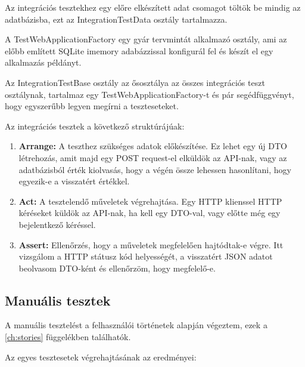 Az integrációs tesztekhez egy előre elkészített adat csomagot töltök be mindig az adatbázisba, ezt az IntegrationTestData osztály tartalmazza.

A TestWebApplicationFactory egy gyár tervmintát alkalmazó osztály, ami az előbb említett SQLite imemory adabázzissal konfigurál fel és készít el egy alkalmazás példányt.

Az IntegrationTestBase osztály az ősosztálya az összes integrációs teszt osztálynak, tartalmaz egy TestWebApplicationFactory-t és pár segédfüggvényt, hogy egyszerűbb legyen megírni a teszteseteket.

Az integrációs tesztek a következő struktúrájúak:
\begin{enumerate}
	\item \textbf{Arrange:} A teszthez szükséges adatok előkészítése. Ez lehet egy új DTO létrehozás, amit majd egy POST request-el elküldök az API-nak, vagy az adatbázisból érték kiolvasás, hogy a végén össze lehessen hasonlítani, hogy egyezik-e a visszatért értékkel.
	\item \textbf{Act:} A tesztelendő műveletek végrehajtása. Egy HTTP klienssel HTTP kéréseket küldök az API-nak, ha kell egy DTO-val, vagy előtte még egy bejelentkező kéréssel.
	\item \textbf{Assert:} Ellenőrzés, hogy a műveletek megfelelően hajtódtak-e végre. Itt vizsgálom a HTTP státusz kód helyességét, a visszatért JSON adatot beolvasom DTO-ként és ellenőrzöm, hogy megfelelő-e.
\end{enumerate}

\clearpage

\subsection{Manuális tesztek}

A manuális tesztelést a felhasználói történetek alapján végeztem, ezek a \ref{ch:stories} függelékben találhatók.

Az egyes tesztesetek végrehajtásának az eredményei:

